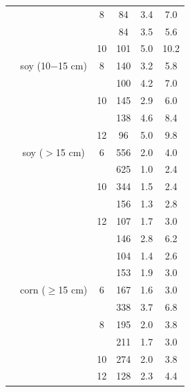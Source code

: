 \documentclass[authoryear]{elsarticle}
\begin{document}
\begin{table}[H]
{\begin{tabular}{lccccc}
      &  & 8 & 84  & 3.4 & 7.0\\
      &  &   & 84  & 3.5 & 5.6\\
      &  & 10& 101 & 5.0 & 10.2\\
      \cmidrule(1r){2-6}
      & soy (10$-$15 cm)
         & 8 & 140 & 3.2 & 5.8\\
      &  &   & 100 & 4.2 & 7.0\\
      &  & 10& 145 & 2.9 & 6.0\\
      &  &   & 138 & 4.6 & 8.4\\
      &  & 12& 96  & 5.0 & 9.8\\
      \cmidrule(1r){2-6}
      & soy ($>$15 cm)
         & 6 & 556 & 2.0 & 4.0\\
      &  &   & 625 & 1.0 & 2.4\\
      &  & 10& 344 & 1.5 & 2.4\\
      &  &   & 156 & 1.3 & 2.8\\
      &  & 12& 107 & 1.7 & 3.0\\
      &  &   & 146 & 2.8 & 6.2\\
      &  &   & 104 & 1.4 & 2.6\\
      &  &   & 153 & 1.9 & 3.0\\
      \cmidrule(1r){2-6}
      & corn ($\ge$15 cm)
         & 6 & 167 & 1.6 & 3.0\\
      &  &   & 338 & 3.7 & 6.8\\
      &  & 8 & 195 & 2.0 & 3.8 \\
      &  &   & 211 & 1.7 & 3.0\\
      &  & 10& 274 & 2.0 & 3.8\\
      &  & 12& 128 & 2.3 & 4.4\\
      \bottomrule
    \end{tabular}
  }
  \label{table:all_trials}
\end{table}

\begin{table}[H]
  \centering
  \caption{RMSE and 95$^{th}$ Percentile
    with respect to crop-stage.} 
  \label{table:travel_speed}
\end{table}
\end{document}
